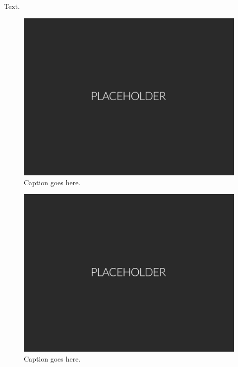 Text.
%
\begin{figure}[H]
    \hypertarget{fig1}{}
    \centering
    \includegraphics[width=0.5\columnwidth]{fig/placeholder.pdf}
    \caption{Caption goes here.}
\end{figure}
%
\begin{figure}[H]
    \hypertarget{fig2}{}
    \centering
    \includegraphics[width=0.5\columnwidth]{fig/placeholder.pdf}
    \caption{Caption goes here.}
\end{figure}
